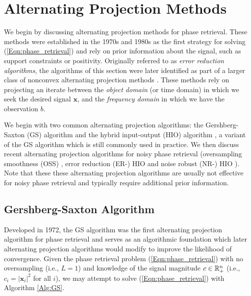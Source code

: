 \section{Alternating Projection Methods}		\label{Subsubsec:phase_retrieval-alternating_direction_methods}



We begin by discussing alternating projection methods for phase retrieval.  
These methods were established in the 1970s and 1980s as the first strategy for solving (\ref{Eqn:phase_retrieval}) and rely on prior information about the signal, such as support constraints or positivity.  
Originally referred to as \textit{error reduction algorithms}, the algorithms of this section were later identified as part of a larger class of nonconvex alternating projection methods \cite{LeviS84}.  
These methods rely on projecting an iterate between the \textit{object domain} (or time domain) in which we seek the desired signal $\mathbf{x}$, and the \textit{frequency domain} in which we have the observation $b$.  




We begin with two common alternating projection algorithms: the Gershberg-Saxton (GS) algorithm \cite{GS72} and the hybrid input-output (HIO) algorithm \cite{Fienup82}, a variant of the GS algorithm which is still commonly used in practice.  
We then discuss recent alternating projection algorithms for noisy phase retrieval (oversampling smoothness (OSS) \cite{rodriguez2013oversampling}, error reduction (ER-) HIO and noise robust (NR-) HIO \cite{martin2012noise}).
Note that these these alternating projection algorithms are usually not effective for noisy phase retrieval and typically require additional prior information.




\subsection{Gershberg-Saxton Algorithm}

Developed in 1972, the GS algorithm was the first alternating projection algorithm for phase retrieval and serves as an algorithmic foundation which later alternating projection algorithms would modify to improve the likelihood of convergence.  
Given the phase retrieval problem (\ref{Eqn:phase_retrieval}) with no oversampling (i.e., $L=1$) and knowledge of the signal magnitude $c \in {\mathbb R}^n_+$ (i.e., $c_i = |\mathbf{x}_i|^2$ for all $i$), we may attempt to solve (\ref{Eqn:phase_retrieval}) with Algorithm \ref{Alg:GS}.

